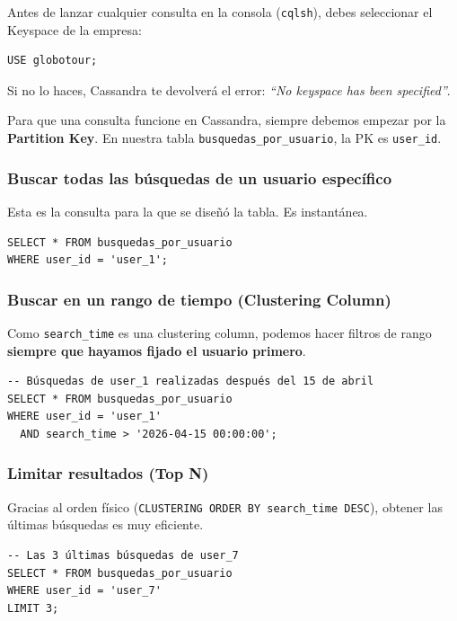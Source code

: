 \documentclass[12pt,a4paper]{article}
\begin{document}
\begin{tcolorbox}[title=Paso previo obligatorio, colframe=red!75!black]
Antes de lanzar cualquier consulta en la consola (\texttt{cqlsh}), debes seleccionar el Keyspace de la empresa:
\begin{lstlisting}[language=CQL]
USE globotour;
\end{lstlisting}
Si no lo haces, Cassandra te devolverá el error: \textit{\enquote{No keyspace has been specified}}.
\end{tcolorbox}

Para que una consulta funcione en Cassandra, siempre debemos empezar por la \textbf{Partition Key}. En nuestra tabla \texttt{busquedas\_por\_usuario}, la PK es \texttt{user\_id}.

\subsubsection{Buscar todas las búsquedas de un usuario específico}
Esta es la consulta para la que se diseñó la tabla. Es instantánea.

\begin{lstlisting}[language=CQL]
SELECT * FROM busquedas_por_usuario 
WHERE user_id = 'user_1';
\end{lstlisting}

\subsubsection{Buscar en un rango de tiempo (Clustering Column)}
Como \texttt{search\_time} es una clustering column, podemos hacer filtros de rango \textbf{siempre que hayamos fijado el usuario primero}.

\begin{lstlisting}[language=CQL]
-- Búsquedas de user_1 realizadas después del 15 de abril
SELECT * FROM busquedas_por_usuario 
WHERE user_id = 'user_1' 
  AND search_time > '2026-04-15 00:00:00';
\end{lstlisting}

\subsubsection{Limitar resultados (Top N)}
Gracias al orden físico (\texttt{CLUSTERING ORDER BY search\_time DESC}), obtener las últimas búsquedas es muy eficiente.

\begin{lstlisting}[language=CQL]
-- Las 3 últimas búsquedas de user_7
SELECT * FROM busquedas_por_usuario 
WHERE user_id = 'user_7' 
LIMIT 3;
\end{lstlisting}
\end{document}

